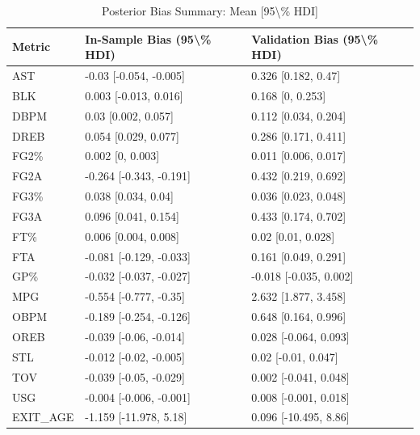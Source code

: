\begin{table}[t]
\caption*{
{\fontsize{20}{25}\selectfont  Posterior Bias Summary: Mean [95\textbackslash{}\% HDI]\fontsize{12}{15}\selectfont }
} 
\fontsize{12.0pt}{14.0pt}\selectfont
\begin{tabular*}{\linewidth}{@{\extracolsep{\fill}}lll}
\toprule
Metric & In-Sample Bias (95\textbackslash{}\% HDI) & Validation Bias (95\textbackslash{}\% HDI) \\ 
\midrule\addlinespace[2.5pt]
AST & -0.03 [-0.054, -0.005] & 0.326 [0.182, 0.47] \\ 
BLK & 0.003 [-0.013, 0.016] & 0.168 [0, 0.253] \\ 
DBPM & 0.03 [0.002, 0.057] & 0.112 [0.034, 0.204] \\ 
DREB & 0.054 [0.029, 0.077] & 0.286 [0.171, 0.411] \\ 
FG2\% & 0.002 [0, 0.003] & 0.011 [0.006, 0.017] \\ 
FG2A & -0.264 [-0.343, -0.191] & 0.432 [0.219, 0.692] \\ 
FG3\% & 0.038 [0.034, 0.04] & 0.036 [0.023, 0.048] \\ 
FG3A & 0.096 [0.041, 0.154] & 0.433 [0.174, 0.702] \\ 
FT\% & 0.006 [0.004, 0.008] & 0.02 [0.01, 0.028] \\ 
FTA & -0.081 [-0.129, -0.033] & 0.161 [0.049, 0.291] \\ 
GP\% & -0.032 [-0.037, -0.027] & -0.018 [-0.035, 0.002] \\ 
MPG & -0.554 [-0.777, -0.35] & 2.632 [1.877, 3.458] \\ 
OBPM & -0.189 [-0.254, -0.126] & 0.648 [0.164, 0.996] \\ 
OREB & -0.039 [-0.06, -0.014] & 0.028 [-0.064, 0.093] \\ 
STL & -0.012 [-0.02, -0.005] & 0.02 [-0.01, 0.047] \\ 
TOV & -0.039 [-0.05, -0.029] & 0.002 [-0.041, 0.048] \\ 
USG & -0.004 [-0.006, -0.001] & 0.008 [-0.001, 0.018] \\ 
EXIT\_AGE & -1.159 [-11.978, 5.18] & 0.096 [-10.495, 8.86] \\ 
\bottomrule
\end{tabular*}
\end{table}

